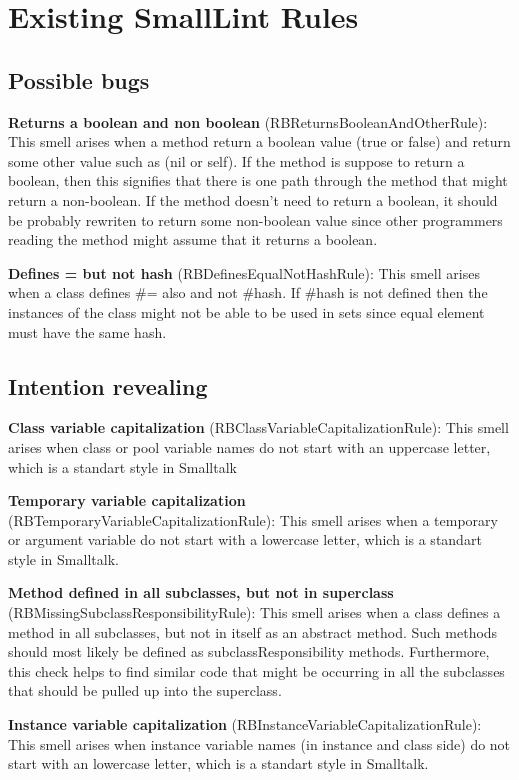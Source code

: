 \section{Existing SmallLint Rules}
\subsection{Possible bugs}
\textbf{Returns a boolean and non boolean} (RBReturnsBooleanAndOtherRule): This smell arises when a method return a boolean value (true or false) and return some other value such as (nil or self). If the method is suppose to return a boolean, then this signifies that there is one path through the method that might return a non-boolean. If the method doesn't need to return a boolean, it should be probably rewriten to return some non-boolean value since other programmers reading the method might assume that it returns a boolean.

\textbf{Defines = but not hash} (RBDefinesEqualNotHashRule): This smell arises when a class defines \#= also and not \#hash. If \#hash is not defined then the instances of the class might not be able to be used in sets since equal element must have the same hash.

\subsection{Intention revealing}
\textbf{Class variable capitalization} (RBClassVariableCapitalizationRule): This smell arises when class or pool variable names do not start with an uppercase letter, which is a standart style in Smalltalk

\textbf{Temporary variable capitalization} (RBTemporaryVariableCapitalizationRule): This smell arises when a temporary or argument variable do not start with a lowercase letter, which is a standart style in Smalltalk.

\textbf{Method defined in all subclasses, but not in superclass} (RBMissingSubclassResponsibilityRule): This smell arises when a class defines a method in all subclasses, but not in itself as an abstract method. Such methods should most likely be defined as subclassResponsibility methods. Furthermore, this check helps to find similar code that might be occurring in all the subclasses that should be pulled up into the superclass.

\textbf{Instance variable capitalization} (RBInstanceVariableCapitalizationRule): This smell arises when instance variable names (in instance and class side) do not start with an lowercase letter, which is a standart style in Smalltalk.

